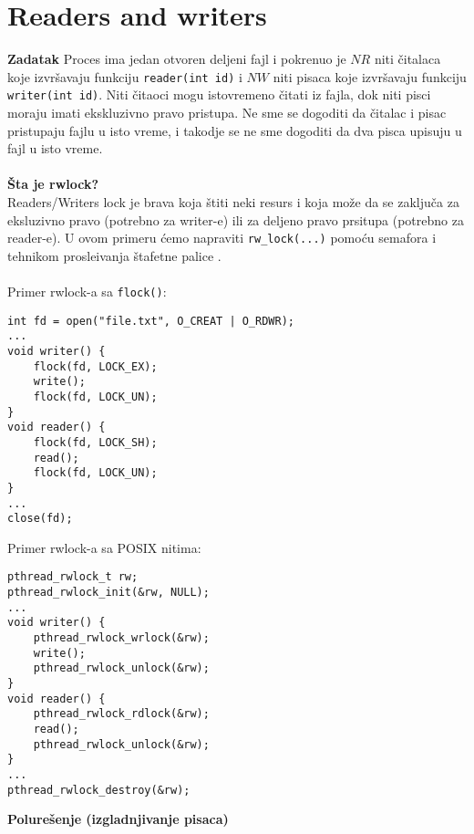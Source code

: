 \clearpage
\section{Readers and writers}
\textbf{\large Zadatak} Proces ima jedan otvoren deljeni fajl i pokrenuo je $NR$ niti \v{c}italaca koje izvr\v{s}avaju funkciju \texttt{reader(int id)} i $NW$ niti pisaca koje izvr\v{s}avaju funkciju \texttt{writer(int id)}. Niti \v{c}itaoci mogu istovremeno \v{c}itati iz fajla, dok niti pisci moraju imati ekskluzivno pravo pristupa. Ne sme se dogoditi da \v{c}italac i pisac pristupaju fajlu u isto vreme, i takodje se ne sme dogoditi da dva pisca upisuju u fajl u isto vreme.\\\\
\textbf{\v{S}ta je rwlock?}\\
Readers/Writers lock je brava koja \v{s}titi neki resurs i koja mo\v{z}e da se zaklju\v{c}a za eksluzivno pravo (potrebno za writer-e) ili za deljeno pravo prsitupa (potrebno za reader-e). U ovom primeru \'{c}emo napraviti \texttt{rw\_lock(...)} pomo\'{c}u semafora i tehnikom prosle\dj{}ivanja \v{s}tafetne palice .
\\\\
Primer rwlock-a sa \texttt{flock()}:
\begin{lstlisting}
int fd = open("file.txt", O_CREAT | O_RDWR);
...
void writer() {
    flock(fd, LOCK_EX);
    write();
    flock(fd, LOCK_UN);
}
void reader() {
    flock(fd, LOCK_SH);
    read();
    flock(fd, LOCK_UN);
}
...
close(fd);
\end{lstlisting}
Primer rwlock-a sa POSIX nitima:
\begin{lstlisting}
pthread_rwlock_t rw;
pthread_rwlock_init(&rw, NULL);
...
void writer() {
    pthread_rwlock_wrlock(&rw);
    write();
    pthread_rwlock_unlock(&rw);
}
void reader() {
    pthread_rwlock_rdlock(&rw);
    read();
    pthread_rwlock_unlock(&rw);
}
...
pthread_rwlock_destroy(&rw);
\end{lstlisting}
\textbf{\large Polure\v{s}enje (izgladnjivanje pisaca)}\\
